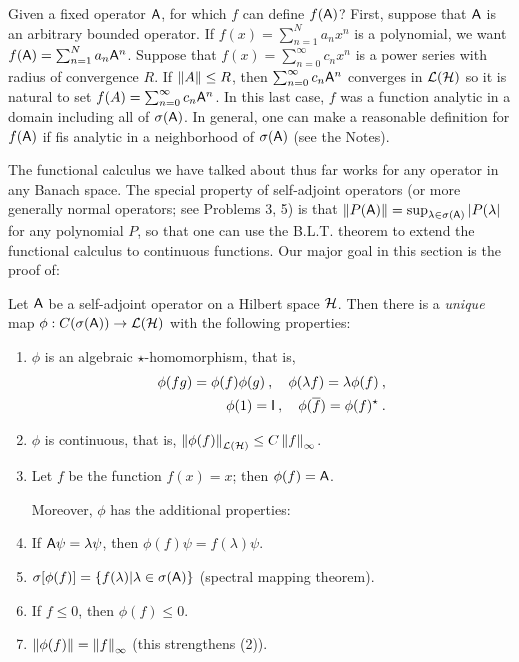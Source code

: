 Given a fixed operator $\mathsf{A}$, for which $f$ can define $f(\mathsf{A})$?
First, suppose that $\mathsf{A}$ is an arbitrary bounded operator. If $f(x) = \sum_{n=1}^N a_n x^n$ is a polynomial, we want $f(\mathsf{A}) = \sum_{n=1}^N a_n \mathsf{A}^n$. Suppose that $f(x) = \sum_{n=0}^\infty c_n x^n$ is a power series with radius of convergence $R$. If $\left \Vert A \right \Vert \leq R$, then $\sum_{n=0}^\infty c_n \mathsf{A}^n$ converges in $\mathcal{L}(\mathcal{H})$ so it is natural to set $f(A) = \sum_{n=0}^\infty c_n \mathsf{A}^n$. In this last case, $f$ was a function analytic in a domain including all of $\sigma(\mathsf{A})$. In general, one can make a reasonable definition for $f(\mathsf{A})$ if fis analytic in a neighborhood of $\sigma(\mathsf{A})$ (see the Notes).

The functional calculus we have talked about thus far works for any operator in any Banach space. The special property of self-adjoint operators (or more generally normal operators; see Problems 3, 5) is that $\left \Vert P(\mathsf{A}) \right \Vert = \sup_{\lambda \in \sigma (\mathsf{A})} |P(\lambda|$ for any polynomial $P$, so that one can use the B.L.T. theorem to extend the functional calculus to continuous functions. Our major goal in this section is the proof of:

\begin{theorem}
    Let $\mathsf{A}$ be a self-adjoint operator on a Hilbert space $\mathcal{H}$. Then there is a \textit{unique} map $\phi: C(\sigma(\mathsf{A})) \to \mathcal{L}(\mathcal{H})$ with the following properties:
    \begin{enumerate}
        \item $\phi$ is an algebraic $\star$-homomorphism, that is,
        \begin{align}
            \phi(fg) = \phi(f) \phi(g) \:, \quad \phi(\lambda f) = \lambda \phi(f) \:, \\
            \phi(1) = \mathsf{I} \:, \quad \phi(\overline{f}) = \phi(f)^\star \:. 
        \end{align}
        \item $\phi$ is continuous, that is, $\left \Vert \phi(f) \right \Vert_{\mathcal{L}(\mathcal{H})} \leq C \left \Vert f \right \Vert_{\infty}$.
        \item Let $f$ be the function $f(x) = x$; then $\phi(f) = \mathsf{A}$.
        
        Moreover, $\phi$ has the additional properties:

        \item If $\mathsf{A} \psi = \lambda \psi$, then $\phi(f) \psi = f(\lambda) \psi$.
        \item $\sigma[\phi(f)] = \left \lbrace f(\lambda) | \lambda \in \sigma(\mathsf{A}) \right \rbrace$ (spectral mapping theorem).
        \item If $f \leq 0$, then $\phi(f) \leq 0$.
        \item $\left \Vert \phi(f) \right \Vert = \left \Vert f \right \Vert_{\infty}$ (this strengthens (2)). 
    \end{enumerate}
\end{theorem}

